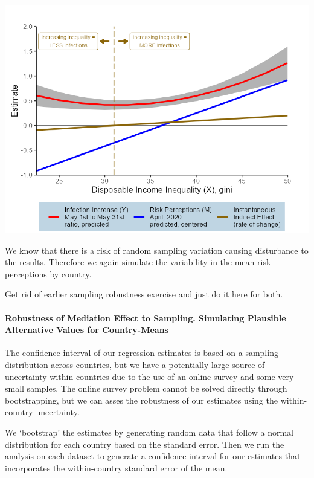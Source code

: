\documentclass[
]{article}
\begin{document}
\includegraphics[width=11.11in]{results/Fig5}

We know that there is a risk of random sampling variation causing
disturbance to the results. Therefore we again simulate the variability
in the mean risk perceptions by country.

Get rid of earlier sampling robustness exercise and just do it here for
both.

\hypertarget{robustness-of-mediation-effect-to-sampling.-simulating-plausible-alternative-values-for-country-means}{%
\paragraph{Robustness of Mediation Effect to Sampling. Simulating
Plausible Alternative Values for
Country-Means}\label{robustness-of-mediation-effect-to-sampling.-simulating-plausible-alternative-values-for-country-means}}

The confidence interval of our regression estimates is based on a
sampling distribution across countries, but we have a potentially large
source of uncertainty within countries due to the use of an online
survey and some very small samples. The online survey problem cannot be
solved directly through bootstrapping, but we can asses the robustness
of our estimates using the within-country uncertainty.

We `bootstrap' the estimates by generating random data that follow a
normal distribution for each country based on the standard error. Then
we run the analysis on each dataset to generate a confidence interval
for our estimates that incorporates the within-country standard error of
the mean.
\end{document}
